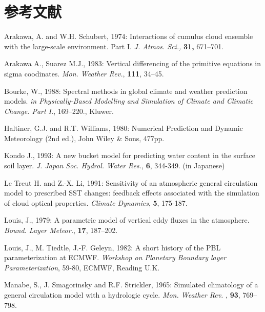 ﻿
\section*{参考文献}

\begin{description}
\item Arakawa, A. and W.H. Schubert, 1974:
      Interactions of cumulus cloud ensemble with the large-scale
      environment. Part I. {\em J. Atmos. Sci.,\/} {\bf 31,} 671--701.

\item Arakawa A., Suarez M.J., 1983:
      Vertical differencing of the primitive equations
      in sigma coodinates.
      {\it Mon. Weather Rev.}, {\bf 111}, 34--45.

\item Bourke, W., 1988: 
      Spectral methods in global climate and weather prediction models.
      {\it  in Physically-Based Modelling and Simulation of Climate 
              and Climatic Change. Part I.}, 169--220., Kluwer.

\item Haltiner, G.J. and R.T. Williams,  1980: 
      Numerical Prediction and Dynamic Meteorology (2nd ed.),
      John Wiley \& Sons, 477pp.

\item Kondo J., 1993:
      A new bucket model for predicting water content 
      in the surface soil layer.
      {\it J. Japan Soc. Hydrol. Water Res.}, {\bf 6}, 344-349. (in Japanese)

\item Le Treut H. and Z.-X. Li, 1991:
      Sensitivity of an atmospheric general circulation model to
      prescribed SST changes: feedback effects associated with the
      simulation of cloud optical properties.
      {\it Climate Dynamics}, {\bf 5}, 175-187.

\item Louis, J., 1979: 
      A parametric model of vertical eddy fluxes in the 
      atmosphere. 
      {\it Bound. Layer Meteor.}, {\bf 17}, 187--202.

\item Louis, J., M. Tiedtle, J.-F. Geleyn, 1982:
      A short history of the PBL parameterization at ECMWF.
      {\it Workshop on Planetary Boundary layer Parameterization},
      59-80, ECMWF, Reading U.K.

\item Manabe, S., J. Smagorinsky and R.F. Strickler, 1965:
      Simulated climatology of a general circulation model
      with a hydrologic cycle. 
      {\it Mon. Weather Rev.} , {\bf 93}, 769--798.


\end{description}
